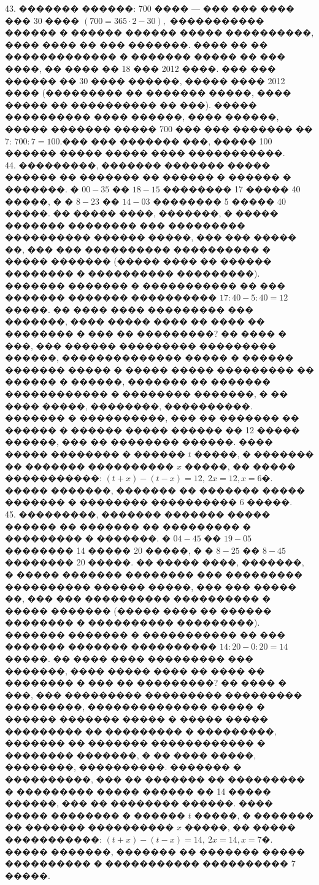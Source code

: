 \documentclass[12pt]{article}
\begin{document}
43. ������� ������: 700 ���� --- ��� ��� ���� ��� 30 ���� $(700=365\cdot2-30),$ ����������� ������ � ������ ������ ����� ����������, ���� ���� �� ��� �������. ���� �� �� ������������� � ������� ����� �� ��� ����, �� ���� �� 18 ��� 2012 ����. ��� ��� ������ �� 30 ���� ������, ����� ���� 2012 ���� (��������� �� ������� �����, ���� ����� �� ���������� �� ���). ����� ���������� ���� ������, ���� ������, ����� ������� ����� 700 ��� ��� ������� �� 7: $700:7=100.$��� ��� ������� ���, ����� 100 ������ ����� ����� ���� �����������.\\
44. ���������, ������� ������� ����� ������ �� ������� �� ������ � ������ � �������. � $00-35$ �� $18-15$ �������� 17 ����� 40 �����, � � $8-23$ �� $14-03$ �������� 5 ����� 40 �����. �� ����� ����, �������, � ����� ������� �������� ��� ��������� ���������� ������ �����, ��� ��� ����� ��, ��� ��� ���������� ���������� � ����� ������� (����� ���� �� ������ �������� � ���������� ���������). ������� ������� � ����������� �� ��� ������� ������� ���������� $17:40-5:40=12$ �����. �� ���� ���� ��������� ��� �������, ���� ����� ���� �� ���� �� �������� � ��� �� ���������? �� ���� � ���, ��� ������ ��������� ��������� ������, �������������� ����� � ������ ������� ����� � ����� ����� ��������� �� ������ � ������, ������� �� ������� ������������ � �������� �������, � �� ���� �����, ��������, ����������. ������� � ����������, ��� �� ������� �� ������ � ������ ����� ������ �� 12 ����� ������, ��� �� �������� ������. ���� ����� �������� � ������ $t$ �����, � ������� �� ������� ���������� $x$ �����, �� ����� �����������: $(t+x)-(t-x)=12,\ 2x=12, x=6$�. ����� �������, ������� �� ������� ����� ������� � �������� ���������� 6 �����.\\
45. ���������, ������� ������� ����� ������ �� ������� �� ��������� � ��������� � �������. � $04-45$ �� $19-05$ �������� 14 ����� 20 �����, � � $8-25$ �� $8-45$ �������� 20 �����. �� ����� ����, �������, � ����� ������� �������� ��� ��������� ���������� ������ �����, ��� ��� ����� ��, ��� ��� ���������� ���������� � ����� ������� (����� ���� �� ������ �������� � ���������� ���������). ������� ������� � ����������� �� ��� ������� ������� ���������� $14:20-0:20=14$ �����. �� ���� ���� ��������� ��� �������, ���� ����� ���� �� ���� �� �������� � ��� �� ���������? �� ���� � ���, ��� ��������� ��������� ��������� ���������, �������������� ����� � ������ ������� ����� � ����� ����� ��������� �� ��������� � ���������, ������� �� ������� ������������ � �������� �������, � �� ���� �����, ��������, ����������. ������� � ����������, ��� �� ������� �� ��������� � ��������� ����� ������ �� 14 ����� ������, ��� �� �������� ������. ���� ����� �������� � ������ $t$ �����, � ������� �� ������� ���������� $x$ �����, �� ����� �����������: $(t+x)-(t-x)=14,\ 2x=14, x=7$�. ����� �������, ������� �� ������� ����� ���������� � ����������� ���������� 7 �����.\\
\end{document}

